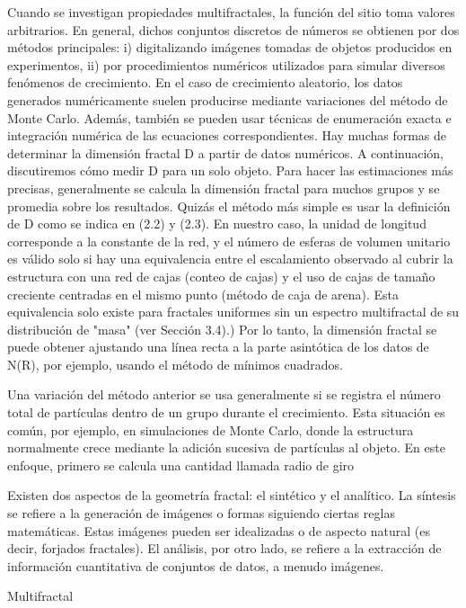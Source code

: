 \documentclass[11pt]{article}
\begin{document}
Cuando se investigan propiedades multifractales, la función del sitio toma valores arbitrarios. En general, dichos conjuntos discretos de números se obtienen por dos métodos principales: i) digitalizando imágenes tomadas de objetos producidos en experimentos, ii) por procedimientos numéricos utilizados para simular diversos fenómenos de crecimiento. En el caso de crecimiento aleatorio, los datos generados numéricamente suelen producirse mediante variaciones del método de Monte Carlo. Además, también se pueden usar técnicas de enumeración exacta e integración numérica de las ecuaciones correspondientes. Hay muchas formas de determinar la dimensión fractal D a partir de datos numéricos. A continuación, discutiremos cómo medir D para un solo objeto. Para hacer las estimaciones más precisas, generalmente se calcula la dimensión fractal para muchos grupos y se promedia sobre los resultados. Quizás el método más simple es usar la definición de  D como se indica en (2.2) y (2.3). En nuestro caso, la unidad de longitud corresponde a la constante de la red, y el número de esferas de volumen unitario es válido solo si hay una equivalencia entre el escalamiento observado al cubrir la estructura con una red de cajas (conteo de cajas) y el uso de cajas de tamaño creciente centradas en el mismo punto (método de caja de arena). Esta equivalencia solo existe para fractales uniformes sin un espectro multifractal de su distribución de "masa" (ver Sección 3.4).) Por lo tanto, la dimensión fractal se puede obtener ajustando una línea recta a la parte asintótica de los datos de  N(R), por ejemplo, usando el método de mínimos cuadrados.

Una variación del método anterior se usa generalmente si se registra el número total de partículas dentro de un grupo durante el crecimiento. Esta situación es común, por ejemplo, en simulaciones de Monte Carlo, donde la estructura normalmente crece mediante la adición sucesiva de partículas al objeto. En este enfoque, primero se calcula una cantidad llamada radio de giro 

Existen dos aspectos de la geometría fractal: el sintético y el analítico. La síntesis se refiere a la generación de imágenes o formas siguiendo ciertas reglas matemáticas. Estas imágenes pueden ser idealizadas o de aspecto natural (es decir, forjados fractales).  El análisis, por otro lado, se refiere a la extracción de información cuantitativa de conjuntos de datos, a menudo imágenes. 

Multifractal
\end{document}
